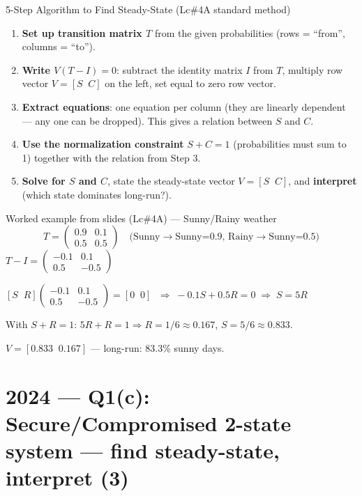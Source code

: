 \documentclass[12pt,a4paper]{article}
\begin{document}
\begin{algobox}{5-Step Algorithm to Find Steady-State (Lc\#4A standard method)}
\begin{enumerate}[noitemsep]
  \item \textbf{Set up transition matrix $T$} from the given probabilities (rows = ``from'', columns = ``to'').
  \item \textbf{Write $V(T-I) = 0$}: subtract the identity matrix $I$ from $T$, multiply row vector $V = [S \;\; C]$ on the left, set equal to zero row vector.
  \item \textbf{Extract equations}: one equation per column (they are linearly dependent --- any one can be dropped). This gives a relation between $S$ and $C$.
  \item \textbf{Use the normalization constraint} $S + C = 1$ (probabilities must sum to 1) together with the relation from Step 3.
  \item \textbf{Solve for $S$ and $C$}, state the steady-state vector $V = [S \;\; C]$, and \textbf{interpret} (which state dominates long-run?).
\end{enumerate}
\end{algobox}

\begin{keybox}{Worked example from slides (Lc\#4A) --- Sunny/Rainy weather}
\[
T = \begin{pmatrix} 0.9 & 0.1 \\ 0.5 & 0.5 \end{pmatrix}
\quad \text{(Sunny$\to$Sunny=0.9, Rainy$\to$Sunny=0.5)}
\]
$T - I = \begin{pmatrix} -0.1 & 0.1 \\ 0.5 & -0.5 \end{pmatrix}$

$[S\;\;R]\begin{pmatrix}-0.1 & 0.1 \\ 0.5 & -0.5\end{pmatrix} = [0\;\;0]$
$\;\Rightarrow\; -0.1S + 0.5R = 0 \;\Rightarrow\; S = 5R$

With $S + R = 1$: $5R + R = 1 \Rightarrow R = 1/6 \approx 0.167$, $S = 5/6 \approx 0.833$.

$\boxed{V = [0.833\;\;0.167]}$ --- long-run: 83.3\% sunny days.
\end{keybox}

\section{2024 --- Q1(c): Secure/Compromised 2-state system --- find steady-state, interpret (3)}
\end{document}
